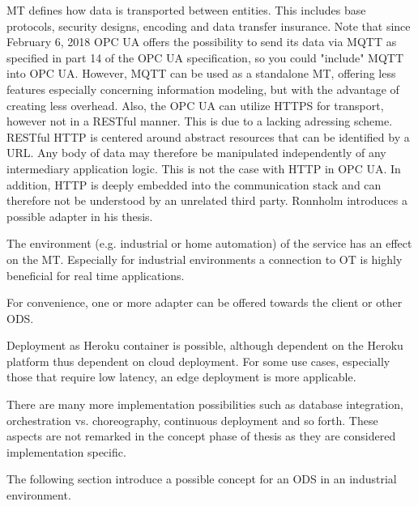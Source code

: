 MT defines how data is transported between entities. This includes base protocols, security designs, encoding and data transfer insurance. Note that since February 6, 2018 OPC UA offers the possibility to send its data via MQTT as specified in part 14 of the OPC UA specification, so you could "include" MQTT into OPC UA. However, MQTT can be used as a standalone MT, offering less features especially concerning information modeling, but with the advantage of creating less overhead. Also, the OPC UA can utilize HTTPS for transport, however not in a RESTful manner. \cite{Ronnholm2018IntegrationTranslator} This is due to a lacking adressing scheme. RESTful HTTP is centered around abstract resources that can be identified by a URL. Any body of data may therefore be manipulated independently of any intermediary application logic. This is not the case with HTTP in OPC UA. In addition, HTTP is deeply embedded into the communication stack and can therefore not be understood by an unrelated third party. Ronnholm introduces a possible adapter in his thesis. \cite{Ronnholm2018IntegrationTranslator}

The environment (e.g. industrial or home automation) of the service has an effect on the MT. Especially for industrial environments a connection to OT is highly beneficial for real time applications. 

For convenience, one or more adapter can be offered towards the client or other ODS. 

Deployment as Heroku container is possible, although dependent on the Heroku platform thus dependent on cloud deployment. For some use cases, especially those that require low latency, an edge deployment is more applicable. 

There are many more implementation possibilities such as database integration, orchestration vs. choreography, continuous deployment and so forth. These aspects are not remarked in the concept phase of thesis as they are considered implementation specific.

The following section introduce a possible concept for an ODS in an industrial environment.
